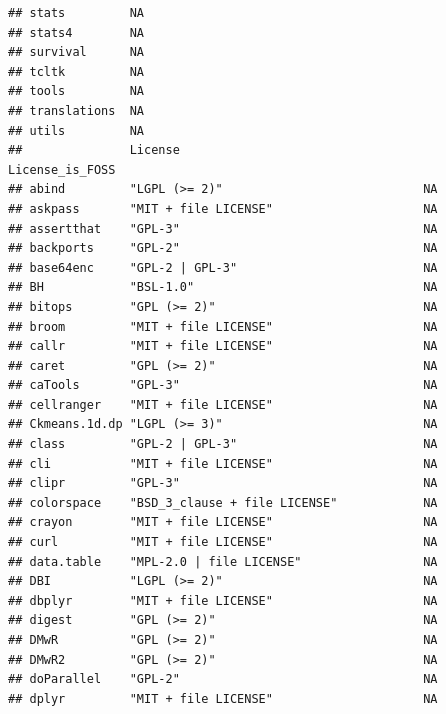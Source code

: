 \documentclass[]{article}
\begin{document}
\begin{verbatim}
## stats         NA                                                        
## stats4        NA                                                        
## survival      NA                                                        
## tcltk         NA                                                        
## tools         NA                                                        
## translations  NA                                                        
## utils         NA                                                        
##               License                                  License_is_FOSS
## abind         "LGPL (>= 2)"                            NA             
## askpass       "MIT + file LICENSE"                     NA             
## assertthat    "GPL-3"                                  NA             
## backports     "GPL-2"                                  NA             
## base64enc     "GPL-2 | GPL-3"                          NA             
## BH            "BSL-1.0"                                NA             
## bitops        "GPL (>= 2)"                             NA             
## broom         "MIT + file LICENSE"                     NA             
## callr         "MIT + file LICENSE"                     NA             
## caret         "GPL (>= 2)"                             NA             
## caTools       "GPL-3"                                  NA             
## cellranger    "MIT + file LICENSE"                     NA             
## Ckmeans.1d.dp "LGPL (>= 3)"                            NA             
## class         "GPL-2 | GPL-3"                          NA             
## cli           "MIT + file LICENSE"                     NA             
## clipr         "GPL-3"                                  NA             
## colorspace    "BSD_3_clause + file LICENSE"            NA             
## crayon        "MIT + file LICENSE"                     NA             
## curl          "MIT + file LICENSE"                     NA             
## data.table    "MPL-2.0 | file LICENSE"                 NA             
## DBI           "LGPL (>= 2)"                            NA             
## dbplyr        "MIT + file LICENSE"                     NA             
## digest        "GPL (>= 2)"                             NA             
## DMwR          "GPL (>= 2)"                             NA             
## DMwR2         "GPL (>= 2)"                             NA             
## doParallel    "GPL-2"                                  NA             
## dplyr         "MIT + file LICENSE"                     NA             

\end{verbatim}
\end{document}
